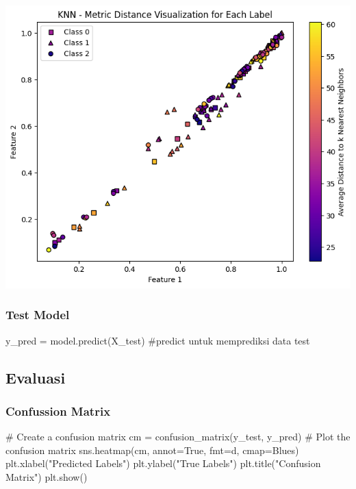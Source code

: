 \documentclass[
  letterpaper,
  DIV=11,
  numbers=noendperiod]{scrreprt}
\newenvironment{Shaded}{\begin{snugshade}}{\end{snugshade}}
\newcommand{\CommentTok}[1]{\textcolor[rgb]{0.37,0.37,0.37}{#1}}
\newcommand{\NormalTok}[1]{\textcolor[rgb]{0.00,0.23,0.31}{#1}}
\newcommand{\OperatorTok}[1]{\textcolor[rgb]{0.37,0.37,0.37}{#1}}
\newcommand{\StringTok}[1]{\textcolor[rgb]{0.13,0.47,0.30}{#1}}
\newcommand{\VariableTok}[1]{\textcolor[rgb]{0.07,0.07,0.07}{#1}}
\begin{document}
\includegraphics{Asset/plt_knndistance.png}

\hypertarget{test-model}{%
\subsubsection*{Test Model}\label{test-model}}

\begin{Shaded}
\begin{Highlighting}[]
\NormalTok{y\_pred }\OperatorTok{=}\NormalTok{ model.predict(X\_test) }\CommentTok{\#predict untuk memprediksi data test}
\end{Highlighting}
\end{Shaded}

\hypertarget{evaluasi}{%
\subsection*{Evaluasi}\label{evaluasi}}

\hypertarget{confussion-matrix}{%
\subsubsection*{Confussion Matrix}\label{confussion-matrix}}

\begin{Shaded}
\begin{Highlighting}[]
\CommentTok{\# Create a confusion matrix}
\NormalTok{cm }\OperatorTok{=}\NormalTok{ confusion\_matrix(y\_test, y\_pred)}
\CommentTok{\# Plot the confusion matrix}
\NormalTok{sns.heatmap(cm, annot}\OperatorTok{=}\VariableTok{True}\NormalTok{, fmt}\OperatorTok{=}\StringTok{\textquotesingle{}d\textquotesingle{}}\NormalTok{, cmap}\OperatorTok{=}\StringTok{\textquotesingle{}Blues\textquotesingle{}}\NormalTok{)}
\NormalTok{plt.xlabel(}\StringTok{"Predicted Labels"}\NormalTok{)}
\NormalTok{plt.ylabel(}\StringTok{"True Labels"}\NormalTok{)}
\NormalTok{plt.title(}\StringTok{"Confusion Matrix"}\NormalTok{)}
\NormalTok{plt.show()}
\end{Highlighting}
\end{Shaded}
\end{document}
